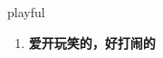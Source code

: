 
\begin{frame}
{\huge playful}
\begin{center}
\begin{enumerate}\Large
  \item \textbf{爱开玩笑的，好打闹的}
\end{enumerate}
\end{center}
\end{frame}
